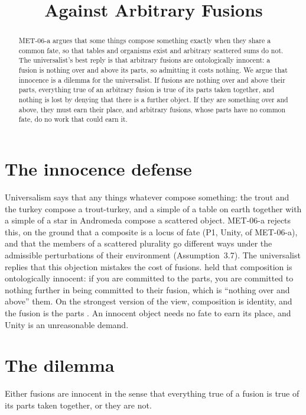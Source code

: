 \documentclass{situationist-preprint}
\title{Against Arbitrary Fusions}
\begin{document}
\maketitle

\begin{abstract}
MET-06-a argues that some things compose something exactly when they share a common fate, so that tables and organisms exist and arbitrary scattered sums do not. The universalist's best reply is that arbitrary fusions are ontologically innocent: a fusion is nothing over and above its parts, so admitting it costs nothing. We argue that innocence is a dilemma for the universalist. If fusions are nothing over and above their parts, everything true of an arbitrary fusion is true of its parts taken together, and nothing is lost by denying that there is a further object. If they are something over and above, they must earn their place, and arbitrary fusions, whose parts have no common fate, do no work that could earn it.
\end{abstract}

\section{The innocence defense}

Universalism says that any things whatever compose something: the trout and the turkey compose a trout-turkey, and a simple of a table on earth together with a simple of a star in Andromeda compose a scattered object. MET-06-a rejects this, on the ground that a composite is a locus of fate (P1, Unity, of MET-06-a), and that the members of a scattered plurality go different ways under the admissible perturbations of their environment (Assumption~3.7). The universalist replies that this objection mistakes the cost of fusions. \citet[\S 3.6]{Lewis1991} held that composition is ontologically innocent: if you are committed to the parts, you are committed to nothing further in being committed to their fusion, which is \enquote{nothing over and above} them. On the strongest version of the view, composition is identity, and the fusion is the parts \citep{Baxter1988,CotnoirBaxter2014}. An innocent object needs no fate to earn its place, and Unity is an unreasonable demand.

\section{The dilemma}

Either fusions are innocent in the sense that everything true of a fusion is true of its parts taken together, or they are not.
\end{document}

